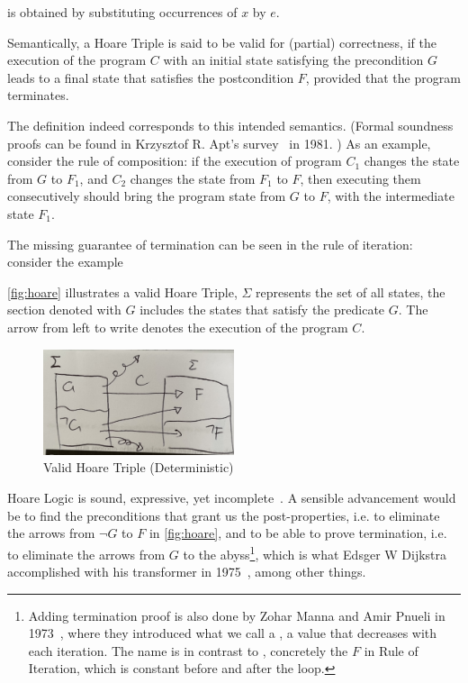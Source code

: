  is obtained by substituting occurrences of $x$ by $e$. 

Semantically, a Hoare Triple {{}} is said to be valid for (partial) correctness, if the execution of the program $C$ with an initial state satisfying the precondition $G$ leads to a final state that satisfies the postcondition $F$, provided that the program terminates. 

The definition indeed corresponds to this intended semantics. (Formal soundness proofs can be found in Krzysztof R. Apt's survey~\cite{apt81} in 1981. )
As an example, consider the rule of composition: if the execution of program $C_1$ changes the state from $G$ to $F_1$, and $C_2$ changes the state from $F_1$ to $F$, then executing them consecutively should bring the program state from $G$ to $F$, with the intermediate state $F_1$.

The missing guarantee of termination can be seen in the rule of iteration: consider the example 

\autoref{fig:hoare} illustrates a valid Hoare Triple, $\Sigma$ represents the set of all states, the section denoted with $G$ includes the states that satisfy the predicate $G$. The arrow from left to write denotes the execution of the program $C$. 


\begin{figure}[ht!]\centering
\includegraphics[width=0.5\textwidth]{image/hoare.jpg}
\caption{Valid Hoare Triple (Deterministic)}
\label{fig:hoare}
\end{figure}


Hoare Logic is sound, expressive, yet incomplete~\cite{apt81}.
A sensible advancement would be to find the  preconditions that grant us the post-properties, i.e. to eliminate the arrows from $\neg G$ to $F$ in \autoref{fig:hoare}, and to be able to prove termination, i.e. to eliminate the arrows from $G$ to the abyss\footnote{Adding termination proof is also done by Zohar Manna and Amir Pnueli in 1973~\cite{manna73}, where they introduced what we call a , a value that decreases with each iteration. The name is in contrast to , concretely the $F$ in Rule of Iteration, which is constant before and after the loop. }, which is what Edsger W Dijkstra accomplished with his  transformer in 1975~\cite{dijkstra75}, among other things. 


